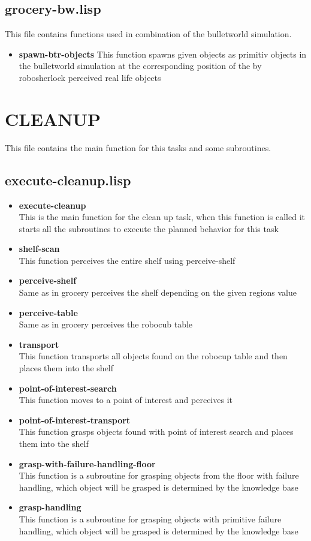 \documentclass[main.tex]{subfiles}
\begin{document}
		\subsection{grocery-bw.lisp}
		This file contains functions used in combination of the bulletworld simulation.
		\begin{itemize}
			\item \textbf{spawn-btr-objects}
			This function spawns given objects as primitiv objects in the bulletworld simulation at the corresponding position of the by robosherlock perceived real life objects 
		\end{itemize}
	  	
	  	\section{CLEANUP}
	  	This file contains the main function for this tasks and some subroutines.
	  	\subsection{execute-cleanup.lisp}
	  	\begin{itemize}
			\item \textbf{execute-cleanup} \\
			This is the main function for the clean up task, when this function is called it starts all the subroutines to execute the planned behavior for this task
			\item \textbf{shelf-scan} \\
			This function perceives the entire shelf using perceive-shelf
			\item \textbf{perceive-shelf} \\
			Same as in grocery perceives the shelf depending on the given regions value
			\item \textbf{perceive-table} \\
			Same as in grocery perceives the robocub table
			\item \textbf{transport} \\
            This function transports all objects found on the robocup table and then places them into the shelf
			\item \textbf{point-of-interest-search} \\
			This function moves to a point of interest and perceives it 
			\item \textbf{point-of-interest-transport} \\
			This function grasps objects found with point of interest search and places them into the shelf
			\item \textbf{grasp-with-failure-handling-floor} \\
			This function is a subroutine for grasping objects from the floor with failure handling, which object will be grasped is determined by the knowledge base
			\item \textbf{grasp-handling}\\
			This function is a subroutine for grasping objects with primitive failure handling, which object will be grasped is determined by the knowledge base
		\end{itemize}
\end{document}
